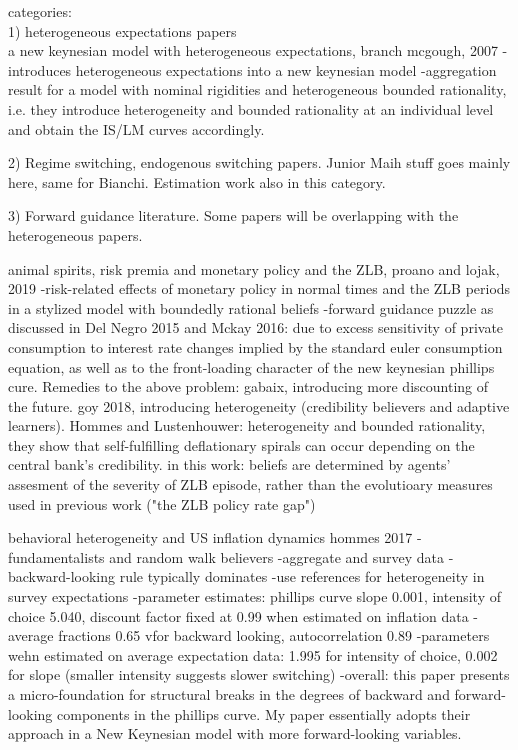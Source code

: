 \documentclass[12pt]{article}
\numberwithin{equation}{section}
\begin{document}
categories:\\


 1) heterogeneous expectations papers \\

a new keynesian model with heterogeneous expectations, branch mcgough, 2007
-introduces heterogeneous expectations into a new keynesian model
-aggregation result for a model with nominal rigidities and heterogeneous bounded rationality, i.e. they introduce heterogeneity and bounded rationality at an individual level and obtain the IS/LM curves accordingly. 


 2) Regime switching, endogenous switching papers. Junior Maih stuff goes mainly here, same for Bianchi. Estimation work also in this category. 

 3) Forward guidance literature. Some papers will be overlapping with the heterogeneous papers. 






animal spirits, risk premia and monetary policy and the ZLB, proano and lojak, 2019
-risk-related effects of monetary policy in normal times and the ZLB periods in a stylized model with boundedly rational beliefs
-forward guidance puzzle as discussed in Del Negro 2015 and Mckay 2016: due to excess sensitivity of private consumption to interest rate changes implied by the standard euler consumption equation, as well as to the front-loading character of the new keynesian phillips cure. 
Remedies to the above problem: gabaix, introducing more discounting of the future. goy 2018, introducing heterogeneity (credibility believers and adaptive learners). Hommes and Lustenhouwer: heterogeneity and bounded rationality, they show that self-fulfilling deflationary spirals can occur depending on the central bank's credibility. 
in this work: beliefs are determined by agents' assesment of the severity of ZLB episode, rather than the evolutioary measures used in previous work ("the ZLB policy rate gap")


behavioral heterogeneity and US inflation dynamics hommes 2017
-fundamentalists and random walk believers
-aggregate and survey data
-backward-looking rule typically dominates
-use references for heterogeneity in survey expectations
-parameter estimates: phillips curve slope 0.001, intensity of choice 5.040, discount factor fixed at 0.99 when estimated on inflation data
-average fractions 0.65 vfor backward looking, autocorrelation 0.89
-parameters wehn estimated on average expectation data: 1.995 for intensity of choice, 0.002 for slope (smaller intensity suggests slower switching)
-overall: this paper presents a micro-foundation for structural breaks in the degrees of backward and forward-looking components in the phillips curve. My paper essentially adopts their approach in a New Keynesian model with more forward-looking variables.
\end{document}
